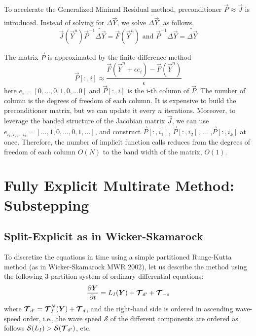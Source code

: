 \documentclass{report}
\numberwithin{equation}{section}
\begin{document}
 To accelerate the Generalized Minimal Residual method, preconditioner $\vec{P} \approx \vec{J}$ is introduced. Instead of solving for $\Delta \vec{Y}$, we solve  $\widetilde{\Delta \vec{Y}}$, as follows, 
\begin{equation*}
    \vec{J}(\vec{Y}^{n}) \vec{P}^{-1} \widetilde{\Delta \vec{Y}} = \vec{F}(\vec{Y}^n) \textrm{ and } \vec{P}^{-1}\Delta \vec{Y} = \widetilde{\Delta \vec{Y}}
\end{equation*}
    
The matrix $\vec{P}$ is approximated by the finite difference method 
\begin{equation*}
 \vec{P}[:, i] \approx \frac{\vec{F}(\vec{Y}^n + \epsilon e_i) - \vec{F}(\vec{Y}^n)}{\epsilon}
\end{equation*}
here $e_i = [0,...,0,1,0,...0]$ and $\vec{P}[:, i]$ is the i-th column of $\vec{P}$. The number of column is the degrees of freedom of each column. It is expensive to build the preconditioner matrix, but we can update it every $n$ iterations. Moreover, to leverage the banded structure of the Jacobian matrix $\vec{J}$, we can use $e_{i_1, i_2, ...i_k} =[...,1,0,...,0,1, ...]$, and construct $\vec{P}[:,i_1]$,  $\vec{P}[:,i_2]$, ... ,$\vec{P}[:,i_k]$ at once. Therefore, the number of implicit function calls reduces from the degrees of freedom of each column $O(N)$ to the band width of the matrix, $O(1)$. 
    






\clearpage
\section{Fully Explicit Multirate Method: Substepping}
\label{sec:substepping}

\subsection{Split-Explicit as in Wicker-Skamarock}
To discretize the equations in time using a simple partitioned Runge-Kutta method (as in Wicker-Skamarock MWR 2002), let us describe the method using the following 3-partition system of ordinary differential equations:
\[
\frac{\partial \boldsymbol{{Y}}}{\partial t}= L_I(\boldsymbol{{Y}}) + \boldsymbol{{\mathcal{T}}}_{d'} + \boldsymbol{{\mathcal{T}}}_{-s}
\]
where $\boldsymbol{{\mathcal{T}}}_{d'}=\boldsymbol{{\mathcal{T}}}^N_{I}(\boldsymbol{{Y}}) + \boldsymbol{{\mathcal{T}}}_{d}$, and the right-hand side is ordered in ascending wave-speed order, i.e., 
the wave speed $\mathcal{S}$ of the different components are ordered as follows $\mathcal{S}(L_I) > \mathcal{S}(\boldsymbol{{\mathcal{T}}}_{d'})$, etc.
\end{document}
